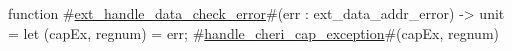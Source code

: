 function #\hyperref[sailRISCVzextzyhandlezydatazycheckzyerror]{ext\_handle\_data\_check\_error}#(err : ext_data_addr_error) -> unit = {
  let (capEx, regnum) = err;
  #\hyperref[sailRISCVzhandlezycherizycapzyexception]{handle\_cheri\_cap\_exception}#(capEx, regnum)
}
